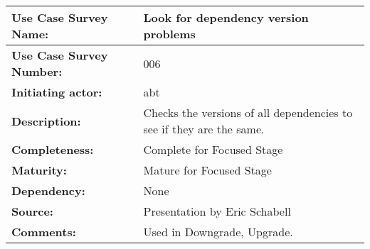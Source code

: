 \begin{tabularx}{\linewidth}{|l|X|}
\hline
\textbf{Use Case Survey Name:} & \textbf{Look for dependency version problems} \\
\hline
\textbf{Use Case Survey Number:} & 006 \\
\hline
\textbf{Initiating actor:} & abt \\
\hline
\textbf{Description:} & Checks the versions of all dependencies to see if they are the same.\\
\hline
\textbf{Completeness:} & Complete for Focused Stage \\
\hline
\textbf{Maturity:} & Mature for Focused Stage \\
\hline
\textbf{Dependency:} & None\\
\hline
\textbf{Source:} & Presentation by Eric Schabell \\
\hline
\textbf{Comments:} & Used in Downgrade, Upgrade. \\
\hline
\end{tabularx}

